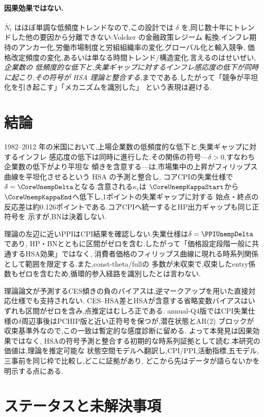 \documentclass[11pt]{article}
\newcommand{\kt}{\kappa_t}
\begin{document}
\paragraph{因果効果ではない.} $\bar N_t$ はほぼ単調な低頻度トレンドなので,この設計では
$\delta$ を,同じ数十年にトレンドした他の要因から分離できない:Volcker の金融政策レジーム
転換,インフレ期待のアンカー化,労働市場制度と労組組織率の変化,グローバル化と輸入競争,
価格改定頻度の変化,あるいは単なる時間トレンド/構造変化.言えるのはせいぜい,\emph{企業数の
低頻度的な低下と,失業ギャップに対するインフレ感応度の低下が同時に起こり,その符号が HSA
理論と整合する},までである.したがって「競争が平坦化を引き起こす」「メカニズムを識別した」
という表現は避ける.

\section{結論}
1982--2012 年の米国において,上場企業数の低頻度的な低下と,失業ギャップに対するインフレ
感応度の低下は同時に進行した.その関係の符号---$\delta>0$,すなわち企業数の低下がより平坦な
傾きを含意する---は,市場集中の上昇がフィリップス曲線を平坦化させるという HSA の予測と整合し,
コアCPIの失業仕様で$\delta=\CoreUnempDelta$となる.含意される$\kt$は
$\CoreUnempKappaStart$から$\CoreUnempKappaEnd$へ低下し,1ポイントの失業ギャップに対する
始点・終点の反応差は約0.126ポイントである.コアCPIへ統一するとHP出力ギャップも同じ正符号を
示すが,BNは決着しない.

理論の左辺に近いPPIはCPI結果を確認しない.失業仕様は$\delta=\PPIUnempDelta$であり,
HP・BNとともに区間がゼロを含む.したがって「価格設定段階一般に共通するHSA効果」ではなく,
消費者価格のフィリップス曲線に現れる時系列関係として範囲を限定する.また,const-theta/fullの
多数が未収束で,収束したentry係数もゼロを含むため,循環的参入経路を識別したとは言わない.

理論論文が予測するCES傾きの負のバイアスは,逆マークアップを用いた直接対応仕様でも支持されない.
CES--HSA差とHSAが含意する省略変数バイアスはいずれも区間がゼロを含み,点推定はむしろ正である.
annual-Q4版ではCPI失業仕様の$\delta$周辺事後はPCHIP版と近い正符号を保つが,潜在状態とAR(2)
ブロックが収束基準外なので,この一致は暫定的な感度診断に留める.
よって本発見は因果効果ではなく,
HSAの符号予測と整合する初期的な時系列証拠として読む.本研究の価値は,理論を推定可能な
状態空間モデルへ翻訳し,CPI/PPI,活動指標,五モデル,三事前を同じ枠で比較し,どこに証拠があり,
どこから先はデータが語らないかを明示する点にある.

\section{ステータスと未解決事項}
\label{sec:status}
\end{document}

